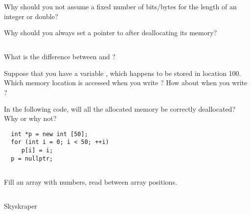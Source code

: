 \begin{exercise}
  Why should you not assume a fixed number of bits/bytes for the
  length of an integer or double?
\end{exercise}

\begin{exercise}
  Why should you always set a pointer to  after
  deallocating its memory?
\end{exercise}

\subsection{\EasyQuestions}

\begin{exercise}
  What is the difference between 
  and ?
\end{exercise}

\begin{exercise}
  Suppose that you have a variable , which happens to be
  stored in location 100.
  Which memory location is accessed when you write
  ?
  How about when you write ?
\end{exercise}

\begin{exercise}
  In the following code, will all the allocated memory be correctly
  deallocated? Why or why not?
\begin{verbatim}
  int *p = new int [50];
  for (int i = 0; i < 50; ++i)
     p[i] = i;
  p = nullptr;
\end{verbatim}
\end{exercise}

\subsection{\MediumQuestions}
\begin{exercise}
  Fill an array with numbers, read between array positions.
\end{exercise}

\subsection{\HarderQuestions}
\begin{exercise}
  Skyskraper
\end{exercise}